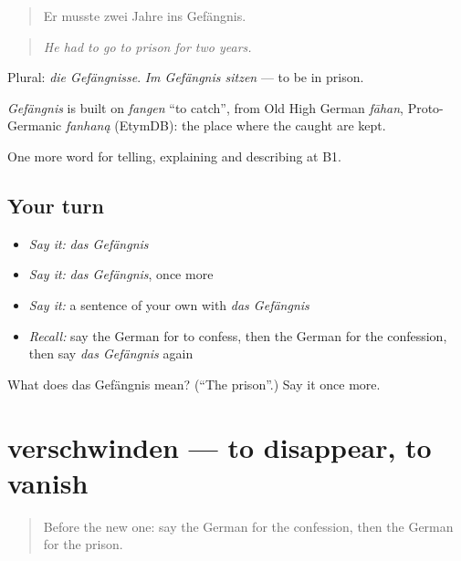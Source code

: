 \begin{quote}
Er musste zwei Jahre ins Gefängnis.
\end{quote}

\begin{quote}
\emph{He had to go to prison for two years.}
\end{quote}

Plural: \emph{die Gefängnisse}. \emph{Im Gefängnis sitzen} — to be in prison.

\begin{cousinweb}
\emph{Gefängnis} is built on \emph{fangen} \textquotedblleft{}to catch\textquotedblright{}, from Old High German \emph{fāhan}, Proto-Germanic \emph{fanhaną} (EtymDB): the place where the caught are kept.
\end{cousinweb}

\begin{grammarlens}[title={What you've built}]
One more word for telling, explaining and describing at B1.
\end{grammarlens}

\subsection*{Your turn}
\begin{itemize}
\raggedright
  \item \emph{Say it:} \emph{das Gefängnis}
  \item \emph{Say it:} \emph{das Gefängnis}, once more
  \item \emph{Say it:} a sentence of your own with \emph{das Gefängnis}
  \item \emph{Recall:} say the German for to confess, then the German for the confession, then say \emph{das Gefängnis} again
\end{itemize}

\begin{tcolorbox}[breakable,colback=teal!4,colframe=teal!35!black,title={Before you move on}]
What does das Gefängnis mean? (\textquotedblleft{}The prison\textquotedblright{}.) Say it once more.
\end{tcolorbox}
\section[verschwinden]{verschwinden — to disappear, to vanish}

\label{lesson:GE-C287-verschwinden}



\begin{quote}
Before the new one: say the German for the confession, then the German for the prison.
\end{quote}

